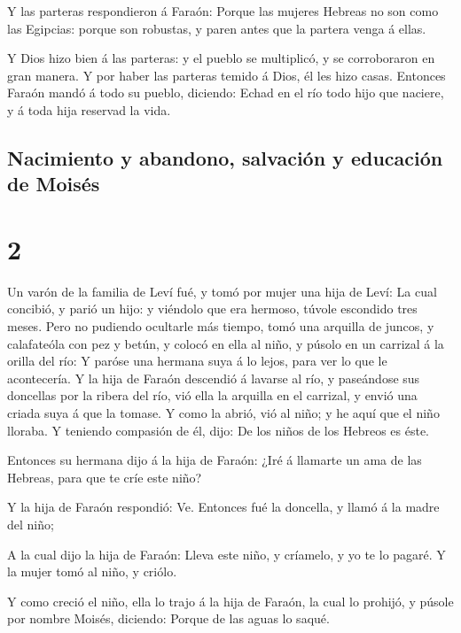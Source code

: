  Y las parteras respondieron á Faraón: Porque las mujeres
Hebreas no son como las Egipcias: porque son robustas, y paren antes que
la partera venga á ellas.

 Y Dios hizo bien á las parteras: y el pueblo se
multiplicó, y se corroboraron en gran manera.  Y por haber
las parteras temido á Dios, él les hizo casas.  Entonces
Faraón mandó á todo su pueblo, diciendo: Echad en el río todo hijo que
naciere, y á toda hija reservad la vida.

\hypertarget{nacimiento-y-abandono-salvaciuxf3n-y-educaciuxf3n-de-moisuxe9s}{%
\subsection{Nacimiento y abandono, salvación y educación de
Moisés}\label{nacimiento-y-abandono-salvaciuxf3n-y-educaciuxf3n-de-moisuxe9s}}

\hypertarget{section-1}{%
\section{2}\label{section-1}}

 Un varón de la familia de Leví fué, y tomó por mujer una
hija de Leví:  La cual concibió, y parió un hijo: y viéndolo
que era hermoso, túvole escondido tres meses.  Pero no
pudiendo ocultarle más tiempo, tomó una arquilla de juncos, y
calafateóla con pez y betún, y colocó en ella al niño, y púsolo en un
carrizal á la orilla del río:  Y paróse una hermana suya á
lo lejos, para ver lo que le acontecería.  Y la hija de
Faraón descendió á lavarse al río, y paseándose sus doncellas por la
ribera del río, vió ella la arquilla en el carrizal, y envió una criada
suya á que la tomase.  Y como la abrió, vió al niño; y he
aquí que el niño lloraba. Y teniendo compasión de él, dijo: De los niños
de los Hebreos es éste.

 Entonces su hermana dijo á la hija de Faraón: ¿Iré á
llamarte un ama de las Hebreas, para que te críe este niño?

 Y la hija de Faraón respondió: Ve. Entonces fué la
doncella, y llamó á la madre del niño;

 A la cual dijo la hija de Faraón: Lleva este niño, y
críamelo, y yo te lo pagaré. Y la mujer tomó al niño, y criólo.

 Y como creció el niño, ella lo trajo á la hija de Faraón,
la cual lo prohijó, y púsole por nombre Moisés, diciendo: Porque de las
aguas lo saqué.

